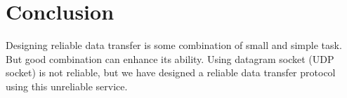 \documentclass[12pt,a4paper]{report}
\begin{document}
\section*{Conclusion}
Designing reliable data transfer is some combination of small and simple task. But good combination can enhance its ability. Using datagram socket (UDP socket) is not reliable, but we have designed a reliable data transfer protocol using this unreliable service.
\end{document}
